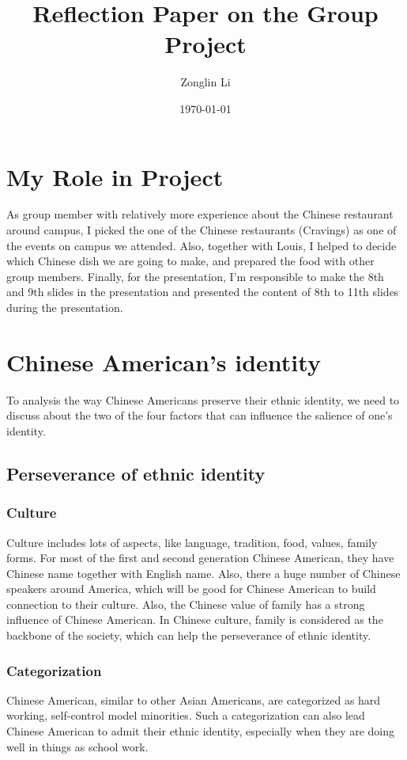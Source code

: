 \documentclass[a4paper,20pt,openany]{article}
\title{Reflection Paper on the Group Project}
\date{\today}
\author{Zonglin Li}
\begin{document}

\maketitle


\section{My Role in Project}

As group member with relatively more experience about the Chinese restaurant
around campus, I picked the one of the Chinese restaurants (Cravings) as one of
the events on campus we attended. Also, together with Louis, I helped to decide
which Chinese dish we are going to make, and prepared the food with other group
members. Finally, for the presentation, I'm responsible to make the 8th and 9th
slides in the presentation and presented the content of 8th to 11th slides
during the presentation.

\section{Chinese American's identity}

To analysis the way Chinese Americans preserve their ethnic identity, we need to
discuss about the two of the four factors that can influence the salience of
one's identity\cite{book:textbook}. 

\subsection{Perseverance of ethnic identity}

\subsubsection{Culture}
Culture includes lots of aspects, like language, tradition, food, values, family
forms\cite{book:textbook}. For most of the first and second generation Chinese
American, they have Chinese name together with English name. Also, there a huge
number of Chinese speakers around America\cite{misc:languagespeaking}, which
will be good for Chinese American to build connection to their culture. Also,
the Chinese value of family has a strong influence of Chinese American. In
Chinese culture, family is considered as the backbone of the
society\cite{misc:cultureprofile}, which can help the perseverance of ethnic
identity.

\subsubsection{Categorization}
Chinese American, similar to other Asian Americans, are categorized as hard
working, self-control model minorities. Such a categorization can also lead
Chinese American to admit their ethnic identity, especially when they are doing
well in things as school work.
\end{document}
